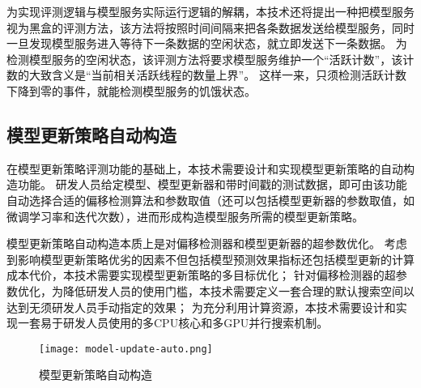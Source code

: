 为实现评测逻辑与模型服务实际运行逻辑的解耦，本技术还将提出一种把模型服务视为黑盒的评测方法，该方法将按照时间间隔来把各条数据发送给模型服务，同时一旦发现模型服务进入等待下一条数据的空闲状态，就立即发送下一条数据。
为检测模型服务的空闲状态，该评测方法将要求模型服务维护一个“活跃计数”，该计数的大致含义是“当前相关活跃线程的数量上界”。
这样一来，只须检测活跃计数下降到零的事件，就能检测模型服务的饥饿状态。

\subsection{模型更新策略自动构造}

在模型更新策略评测功能的基础上，本技术需要设计和实现模型更新策略的自动构造功能。
研发人员给定模型、模型更新器和带时间戳的测试数据，即可由该功能自动选择合适的偏移检测算法和参数取值（还可以包括模型更新器的参数取值，如微调学习率和迭代次数），进而形成构造模型服务所需的模型更新策略。

模型更新策略自动构造本质上是对偏移检测器和模型更新器的超参数优化。
考虑到影响模型更新策略优劣的因素不但包括模型预测效果指标还包括模型更新的计算成本代价，本技术需要实现模型更新策略的多目标优化；
针对偏移检测器的超参数优化，为降低研发人员的使用门槛，本技术需要定义一套合理的默认搜索空间以达到无须研发人员手动指定的效果；
为充分利用计算资源，本技术需要设计和实现一套易于研发人员使用的多CPU核心和多GPU并行搜索机制。

\begin{figure}
  \centering
  \texttt{[image: model-update-auto.png]}
  \caption{模型更新策略自动构造}
  \label{fig:automodelupdate}
\end{figure}

